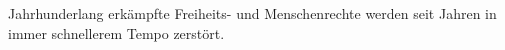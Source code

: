 Jahrhunderlang erkämpfte Freiheits- und Menschenrechte werden seit Jahren in immer schnellerem Tempo zerstört.